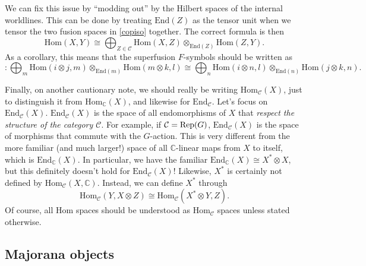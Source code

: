 \documentclass[12pt,a4paper]{article}
\newcommand{\tp}{\otimes}
\newcommand{\cc}{\mathbb{C}}
\newcommand\be            {\begin{equation}}
\newcommand\ee            {\end{equation}}
\newcommand{\mcc}{\mathcal{C}}
\newcommand{\Hom}{\text{Hom}}
\newcommand{\End}{\text{End}}
\begin{document}
We can fix this issue by ``modding out'' by the Hilbert spaces of the internal worldlines. 
This can be done by treating $\End(Z)$ as the tensor unit when we tensor the two fusion spaces in \eqref{copiso} together. The correct formula is then
\be  \Hom(X,Y) \cong \bigoplus_{Z\in \mcc} \Hom(X,Z) \tp_{\End(Z)} \Hom(Z,Y).\ee
As a corollary, this means that the superfusion $F$-symbols should be written as 
\be [F^{ijk}_l] : \bigoplus_m \Hom(i\tp j,m) \tp_{\End(m)} \Hom(m\tp k,l) \cong \bigoplus_n \Hom(i\tp n,l) \tp_{\End(n)} \Hom(j\tp k,n).\ee

Finally, on another cautionary note, we should really be writing $\Hom_\mcc(X)$, just to distinguish it from $\Hom_\cc(X)$, and likewise for $\End_\mcc$. Let's focus on $\End_\mcc(X)$. $\End_\mcc(X)$ is the space of all endomorphisms of $X$ that {\it respect the structure of the category $\mcc$}. For example, if $\mcc = {\rm Rep}(G)$, $\End_\mcc(X)$ is the space of morphisms that commute with the $G$-action. This is very different from the more familiar (and much larger!) space of all $\cc$-linear maps from $X$ to itself, which is $\End_\cc(X)$. In particular, we have the familiar $\End_\cc(X) \cong X^*\tp X$, but this definitely doesn't hold for $\End_\mcc(X)$! Likewise, $X^*$ is certainly not defined by $\Hom_\mcc(X,\cc)$. Instead, we can define $X^*$ through 
\be \Hom_\mcc(Y,X\tp Z) \cong \Hom_\mcc(X^*\tp Y,Z).\ee
Of course, all Hom spaces should be understood as Hom$_\mcc$ spaces unless stated otherwise. 

 
\subsection{Majorana objects}
\end{document}

